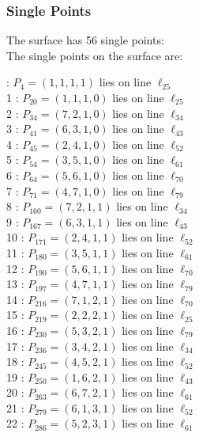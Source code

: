 \documentclass{article}
\begin{document}
{\subsubsection*{Single Points}
The surface has 56 single points:\\
The single points on the surface are:\\
\begin{multicols}{2}
 : $P_{4}=( 1, 1, 1, 1 )$ lies on line $\ell_{25}$\\
1 : $P_{20}=( 1, 1, 1, 0 )$ lies on line $\ell_{25}$\\
2 : $P_{34}=( 7, 2, 1, 0 )$ lies on line $\ell_{34}$\\
3 : $P_{41}=( 6, 3, 1, 0 )$ lies on line $\ell_{43}$\\
4 : $P_{45}=( 2, 4, 1, 0 )$ lies on line $\ell_{52}$\\
5 : $P_{54}=( 3, 5, 1, 0 )$ lies on line $\ell_{61}$\\
6 : $P_{64}=( 5, 6, 1, 0 )$ lies on line $\ell_{70}$\\
7 : $P_{71}=( 4, 7, 1, 0 )$ lies on line $\ell_{79}$\\
8 : $P_{160}=( 7, 2, 1, 1 )$ lies on line $\ell_{34}$\\
9 : $P_{167}=( 6, 3, 1, 1 )$ lies on line $\ell_{43}$\\
10 : $P_{171}=( 2, 4, 1, 1 )$ lies on line $\ell_{52}$\\
11 : $P_{180}=( 3, 5, 1, 1 )$ lies on line $\ell_{61}$\\
12 : $P_{190}=( 5, 6, 1, 1 )$ lies on line $\ell_{70}$\\
13 : $P_{197}=( 4, 7, 1, 1 )$ lies on line $\ell_{79}$\\
14 : $P_{216}=( 7, 1, 2, 1 )$ lies on line $\ell_{70}$\\
15 : $P_{219}=( 2, 2, 2, 1 )$ lies on line $\ell_{25}$\\
16 : $P_{230}=( 5, 3, 2, 1 )$ lies on line $\ell_{79}$\\
17 : $P_{236}=( 3, 4, 2, 1 )$ lies on line $\ell_{34}$\\
18 : $P_{245}=( 4, 5, 2, 1 )$ lies on line $\ell_{52}$\\
19 : $P_{250}=( 1, 6, 2, 1 )$ lies on line $\ell_{43}$\\
20 : $P_{263}=( 6, 7, 2, 1 )$ lies on line $\ell_{61}$\\
21 : $P_{279}=( 6, 1, 3, 1 )$ lies on line $\ell_{52}$\\
22 : $P_{286}=( 5, 2, 3, 1 )$ lies on line $\ell_{61}$\\

\end{multicols}}
\end{document}
